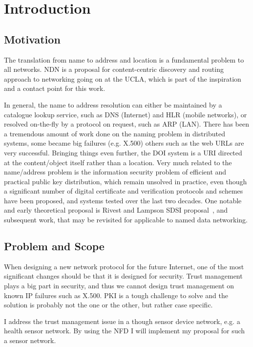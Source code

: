 \chapter{Introduction}\label{chp:introduction} 

\section{Motivation}
The translation from name to address and location is a fundamental problem to all networks.
\gls{NDN} is a proposal for content-centric discovery and routing approach to networking
going on at the \gls{UCLA}, which is part of the inspiration and a contact point for this work.

In general, the name to address resolution can either be maintained by a catalogue lookup service, 
such as \gls{DNS} (Internet) and \gls{HLR} (mobile networks), 
or resolved on-the-fly by a protocol on request, such as \gls{ARP} (\gls{LAN}). 
There has been a tremendous amount of work done on the naming problem in distributed systems, 
some became big failures (e.g. X.500) others such as the web \gls{URL}s are very successful. 
Bringing things even further, the \gls{DOI} system is a \gls{URI} directed at the content/object itself rather than a location. 
Very much related to the name/address problem is the information security problem of efficient and practical public key distribution, 
which remain unsolved in practice, even though a significant number of digital certificate and verification protocols and schemes have been proposed, and systems tested over the last two decades. 
One notable and early theoretical proposal is Rivest and Lampson \gls{SDSI} proposal~\cite{rivest1996sdsi},
and subsequent work, that may be revisited for applicable to named data networking.

\section{Problem and Scope}

When designing a new network protocol for the future Internet, one of the most significant changes should be that it is designed for security.
Trust management plays a big part in security, and thus we cannot design trust management on known \gls{IP} failures such as X.500. 
\gls{PKI} is a tough challenge to solve and the solution is probably not the one or the other, but rather case specific.

I address the trust management issue in a though sensor device network, e.g. a health sensor network.
By using the \gls{NFD} I will implement my proposal for such a sensor network.

